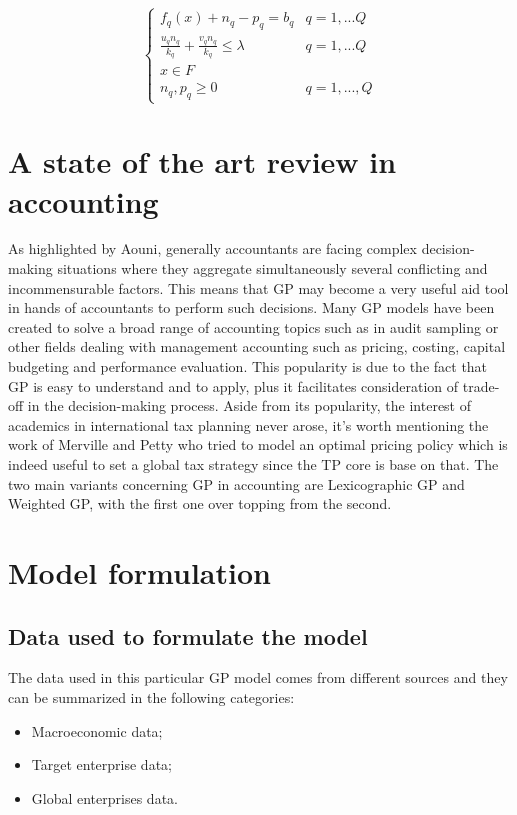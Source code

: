 \documentclass{article}
\begin{document}
\[
\begin{cases}
f_q(x)+n_q-p_q=b_q & q=1,...Q
\\
\frac{u_q n_q}{k_q}+\frac{v_q n_q}{k_q}\leq\lambda & q=1,...Q
\\
x\in F
\\
n_q,p_q\geq0 & q=1,...,Q
\end{cases}
\]

\section{A state of the art review in accounting}
As highlighted by Aouni\cite{aouni_goal_2017}, generally accountants are facing complex decision-making situations where they aggregate simultaneously several conflicting and incommensurable factors. This means that GP may become a very useful aid tool in hands of accountants to perform such decisions. Many GP models have been created to solve a broad range of accounting topics such as in audit sampling\cite{tayi_integration_1985} or other fields dealing with management accounting such as pricing\cite{tan_multipleobjective_2008}, costing\cite{dowlatshahi_product_2001}, capital budgeting and performance evaluation\cite{hung_integrated_2011}.
This popularity is due to the fact that GP is easy to understand and to apply, plus it facilitates consideration of trade-off in the decision-making process.
Aside from its popularity, the interest of academics in international tax planning never arose,
it’s worth mentioning the work of Merville and Petty\cite{merville_transfer_1978} who tried to model an optimal pricing policy which is indeed useful to set a global tax
strategy since the TP core is base on that.
The two main variants concerning GP in accounting are Lexicographic GP and Weighted GP, with the first one over topping from the second.

\section{Model formulation}

\subsection{Data used to formulate the model}
The data used in this particular GP model comes from different sources and they can be summarized in the following categories:
\begin{itemize}
    \item Macroeconomic data;
    \item Target enterprise data;
    \item Global enterprises data.
\end{itemize}
\end{document}
